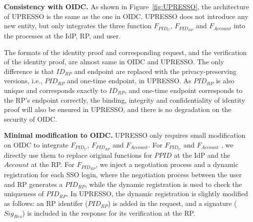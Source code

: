 \vspace{1mm}\noindent \textbf{Consistency with OIDC.}
As shown in Figure~\ref{fig:UPRESSO}, the architecture of UPRESSO is the same as the one in OIDC. UPRESSO does not introduce any new entity, but only integrates the three function $F_{PID_U}$, $F_{PID_{RP}}$ and $F_{Account}$ into the processes at the IdP, RP, and user.

The formats of the  identity proof and corresponding request, and the verification of the identity proof,  are almost same in OIDC and UPRESSO.
The only difference is that $ID_{RP}$ and endpoint are replaced with the privacy-preserving versions, i.e., $PID_{RP}$ and one-time endpoint, in UPRESSO.
As $PID_{RP}$ is also unique and corresponds exactly to $ID_{RP}$, and one-time endpoint corresponds to the RP's endpoint correctly,
 the binding, integrity and confidentiality of identity proof will also be ensured in UPRESSO, and there is no degradation on the security of OIDC.

\vspace{1mm}\noindent \textbf{Minimal modification to OIDC.}
UPRESSO only requires small modification on OIDC to integrate $F_{PID_U}$, $F_{PID_{RP}}$ and $F_{Account}$.
For $F_{PID_U}$ and $F_{Account}$ , we directly use them to replace original functions for $PPID$ at the IdP and the $Account$ at the RP.
For $F_{PID_{RP}}$, we inject a negotiation process and a dynamic registration for each SSO login,
 where the negotiation process between the user and RP generates a $PID_{RP}$,
  while the dynamic registration is used to check the uniqueness of $PID_{RP}$.
In UPRESSO, the dynamic registration is slightly modified as follows: an RP identifer ($PID_{RP}$)  is added in the request, and a signature ($Sig_{Res}$)  is included in the response for its verification at the RP.





